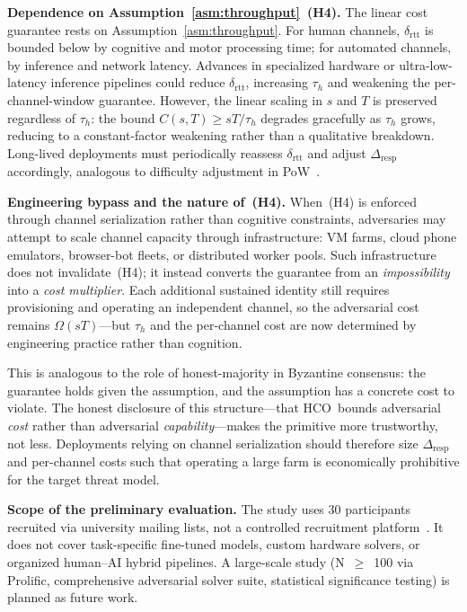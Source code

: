 \documentclass[11pt]{article}
\newcommand{\HCO}{HCO\xspace}
\theoremstyle{remark}
\theoremstyle{plain}
\begin{document}
	\noindent\textbf{Dependence on Assumption~\ref{asm:throughput}~(H4).}
	The linear cost guarantee rests on Assumption~\ref{asm:throughput}.
	For human channels, $\delta_{\mathrm{rtt}}$ is bounded below by
	cognitive and motor processing time; for automated channels, by
	inference and network latency. Advances in specialized hardware or
	ultra-low-latency inference pipelines could reduce
	$\delta_{\mathrm{rtt}}$, increasing $\tau_h$ and weakening the
	per-channel-window guarantee. However, the linear scaling in $s$ and
	$T$ is preserved regardless of $\tau_h$: the bound
	$C(s,T) \geq sT/\tau_h$ degrades gracefully as $\tau_h$ grows,
	reducing to a constant-factor weakening rather than a qualitative
	breakdown. Long-lived deployments must periodically reassess
	$\delta_{\mathrm{rtt}}$ and adjust $\Delta_{\mathrm{resp}}$
	accordingly, analogous to difficulty adjustment in
	PoW~\cite{nakamoto2008bitcoin}.
	
	\noindent\textbf{Engineering bypass and the nature of~(H4).}
	When~(H4) is enforced through channel serialization rather than
	cognitive constraints, adversaries may attempt to scale channel capacity
	through infrastructure: VM farms, cloud phone emulators, browser-bot
	fleets, or distributed worker pools. Such infrastructure does not
	invalidate~(H4); it instead converts the guarantee from an
	\emph{impossibility} into a \emph{cost multiplier}. Each additional
	sustained identity still requires provisioning and operating an
	independent channel, so the adversarial cost remains $\Omega(sT)$---but
	$\tau_h$ and the per-channel cost are now determined by engineering
	practice rather than cognition.
	
	This is analogous to the role of honest-majority in Byzantine consensus:
	the guarantee holds given the assumption, and the assumption has a
	concrete cost to violate. The honest disclosure of this structure---that
	\HCO\ bounds adversarial \emph{cost} rather than adversarial
	\emph{capability}---makes the primitive more trustworthy, not less.
	Deployments relying on channel serialization should therefore size
	$\Delta_{\mathrm{resp}}$ and per-channel costs such that operating a
	large farm is economically prohibitive for the target threat model.
	
	\noindent\textbf{Scope of the preliminary evaluation.}
	The study uses 30 participants recruited via university mailing lists,
	not a controlled recruitment platform~\cite{prolific2014,peer2022data}.
	It does not cover task-specific fine-tuned models, custom hardware
	solvers, or organized human--AI hybrid pipelines. A large-scale study
	(N~$\geq$~100 via Prolific, comprehensive adversarial solver suite,
	statistical significance testing) is planned as future work.
	
\end{document}
